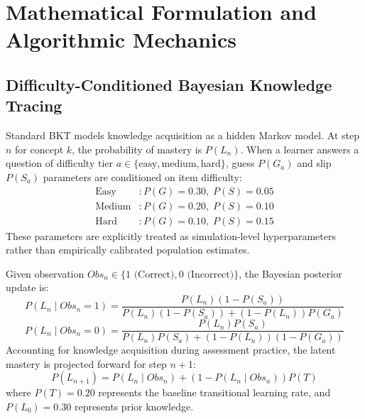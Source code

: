 \documentclass[notitlepage,12pt]{jedm}
\begin{document}
\section{Mathematical Formulation and Algorithmic Mechanics}

\subsection{Difficulty-Conditioned Bayesian Knowledge Tracing}
Standard BKT models knowledge acquisition as a hidden Markov model. At step $n$ for concept $k$, the probability of mastery is $P(L_n)$. When a learner answers a question of difficulty tier $a \in \{\text{easy}, \text{medium}, \text{hard}\}$, guess $P(G_a)$ and slip $P(S_a)$ parameters are conditioned on item difficulty:
\begin{align}
\text{Easy}&: P(G) = 0.30, \; P(S) = 0.05 \\
\text{Medium}&: P(G) = 0.20, \; P(S) = 0.10 \\
\text{Hard}&: P(G) = 0.10, \; P(S) = 0.15
\end{align}
These parameters are explicitly treated as simulation-level hyperparameters rather than empirically calibrated population estimates.

Given observation $Obs_n \in \{1 \text{ (Correct)}, 0 \text{ (Incorrect)}\}$, the Bayesian posterior update is:
\begin{equation}
P(L_n \mid Obs_n = 1) = \frac{P(L_n)(1 - P(S_a))}{P(L_n)(1 - P(S_a)) + (1 - P(L_n))P(G_a)}
\label{eq_bkt_correct}
\end{equation}
\begin{equation}
P(L_n \mid Obs_n = 0) = \frac{P(L_n)P(S_a)}{P(L_n)P(S_a) + (1 - P(L_n))(1 - P(G_a))}
\label{eq_bkt_incorrect}
\end{equation}
Accounting for knowledge acquisition during assessment practice, the latent mastery is projected forward for step $n+1$:
\begin{equation}
P(L_{n+1}) = P(L_n \mid Obs_n) + (1 - P(L_n \mid Obs_n)) P(T)
\label{eq_bkt_project}
\end{equation}
where $P(T) = 0.20$ represents the baseline transitional learning rate, and $P(L_0) = 0.30$ represents prior knowledge.
\end{document}
